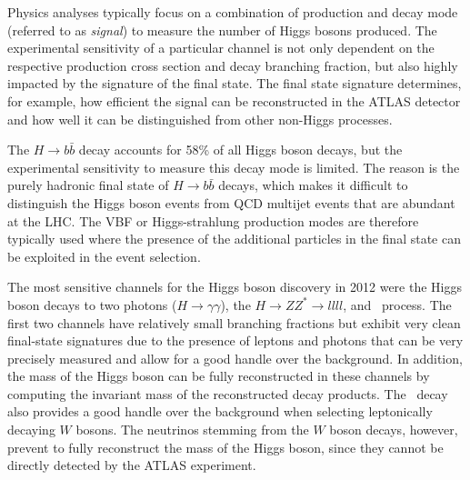Physics analyses typically focus on a combination of production and decay mode (referred to as \emph{signal}) to measure the number of Higgs bosons produced. The experimental sensitivity of a particular channel is not only dependent on the respective production cross section and decay branching fraction, but also highly impacted by the signature of the final state. The final state signature determines, for example, how efficient the signal can be reconstructed in the ATLAS detector and how well it can be distinguished from other non-Higgs processes. 

The $H\rightarrow b\bar{b}$ decay accounts for 58\% of all Higgs boson decays, but the experimental sensitivity to measure this decay mode is limited. The reason is the purely hadronic final state of $H\rightarrow b\bar{b}$ decays, which makes it difficult to distinguish the Higgs boson events from QCD multijet events that are abundant at the LHC.
The VBF or Higgs-strahlung production modes are therefore typically used where the presence of the additional particles in the final state can be exploited in the event selection.

The most sensitive channels for the Higgs boson discovery in 2012 were the Higgs boson decays to two photons ($H \to \gamma\gamma$), the $H \to ZZ^* \to llll$, and \HWW\ process.
The first two channels have relatively small branching fractions but exhibit very clean final-state signatures due to the presence of leptons and photons that can be very precisely measured and allow for a good handle over the background.
In addition, the mass of the Higgs boson can be fully reconstructed in these channels by computing the invariant mass of the reconstructed decay products.
The \HWW\ decay also provides a good handle over the background when selecting leptonically decaying $W$ bosons.
The neutrinos stemming from the $W$ boson decays, however, prevent to fully reconstruct the mass of the Higgs boson, since they cannot be directly detected by the ATLAS experiment.


